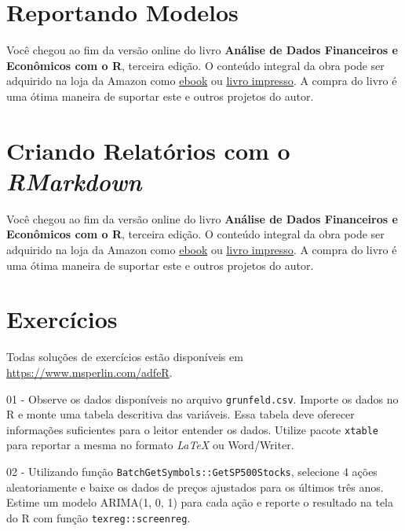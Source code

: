 \documentclass[
  11pt,
]{book}
\newenvironment{pleasebuyit}
{\begin{noteblock}
		
	} {\end{noteblock}}
\begin{document}
\hypertarget{reporting-models}{%
\section{Reportando Modelos}\label{reporting-models}}

\begin{pleasebuyit}
Você chegou ao fim da versão online do livro \textbf{Análise de Dados
Financeiros e Econômicos com o R}, terceira edição. O conteúdo integral
da obra pode ser adquirido na loja da Amazon como
\href{https://www.amazon.com.br/dp/B08WNC27ZY}{ebook} ou
\href{https://www.amazon.com/dp/B08WP8CCDB}{livro impresso}. A compra do
livro é uma ótima maneira de suportar este e outros projetos do autor.
\end{pleasebuyit}

\hypertarget{criando-relatuxf3rios-com-o-rmarkdown}{%
\section{\texorpdfstring{Criando Relatórios com o \emph{RMarkdown}}{Criando Relatórios com o RMarkdown}}\label{criando-relatuxf3rios-com-o-rmarkdown}}

\begin{pleasebuyit}
Você chegou ao fim da versão online do livro \textbf{Análise de Dados
Financeiros e Econômicos com o R}, terceira edição. O conteúdo integral
da obra pode ser adquirido na loja da Amazon como
\href{https://www.amazon.com.br/dp/B08WNC27ZY}{ebook} ou
\href{https://www.amazon.com/dp/B08WP8CCDB}{livro impresso}. A compra do
livro é uma ótima maneira de suportar este e outros projetos do autor.
\end{pleasebuyit}

\hypertarget{exerc-reportando-resultados}{%
\section{Exercícios}\label{exerc-reportando-resultados}}

Todas soluções de exercícios estão disponíveis em \url{https://www.msperlin.com/adfeR}.

01 -
Observe os dados disponíveis no arquivo \texttt{grunfeld.csv}. Importe os dados no R e monte uma tabela descritiva das variáveis. Essa tabela deve oferecer informações suficientes para o leitor entender os dados. Utilize pacote \texttt{xtable} para reportar a mesma no formato \emph{LaTeX} ou Word/Writer.

02 -
Utilizando função \texttt{BatchGetSymbols::GetSP500Stocks}, selecione 4 ações aleatoriamente e baixe os dados de preços ajustados para os últimos três anos. Estime um modelo ARIMA(1, 0, 1) para cada ação e reporte o resultado na tela do R com função \texttt{texreg::screenreg}.
\end{document}
